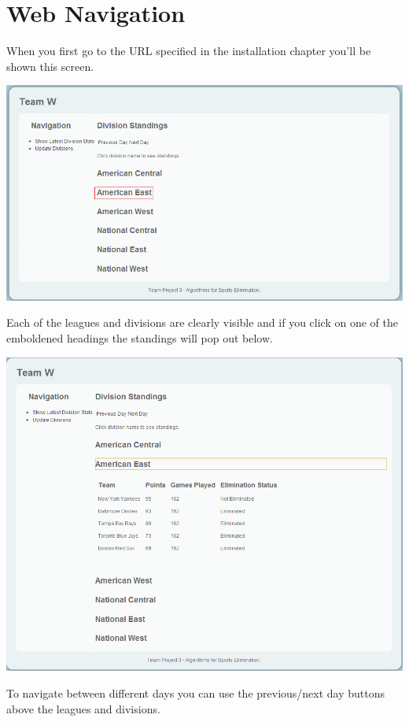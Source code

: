 
\section{Web Navigation}

When you first go to the URL specified in the installation chapter you'll be
shown this screen.

\includegraphics[width=\linewidth,keepaspectratio]{images/userManualWeb1.png}

Each of the leagues and divisions are clearly visible and if you click on one of
the emboldened headings the standings will pop out below.

\includegraphics[width=\linewidth,keepaspectratio]{images/userManualWeb2.png}

To navigate between different days you can use the previous/next day buttons
above the leagues and divisions.

